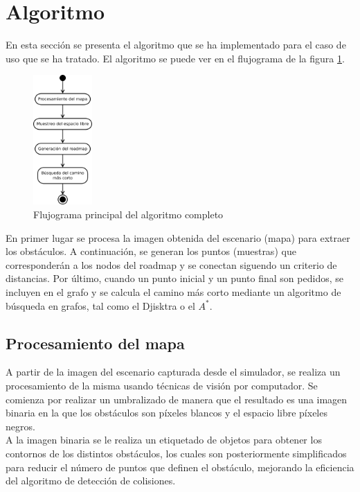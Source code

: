 \section{Algoritmo}
\label{algoritmo}

En esta sección se presenta el algoritmo que se ha implementado para el caso de uso que se ha tratado. El algoritmo se puede ver en el flujograma de la figura \ref{fig:flujo_algoritmo}. \\

\begin{figure}[H]
		\centering
        \includegraphics[width=0.2\textwidth]{images/flujo_main.png}
        \caption{Flujograma principal del algoritmo completo}
        \label{fig:flujo_algoritmo}
\end{figure} 


En primer lugar se procesa la imagen obtenida del escenario (mapa) para extraer los obstáculos. A continuación, se generan los puntos (muestras) que corresponderán a los nodos del roadmap y se conectan siguendo un criterio de distancias. Por último, cuando un punto inicial y un punto final son pedidos, se incluyen en el grafo y se calcula el camino más corto mediante un algoritmo de búsqueda en grafos, tal como el Djisktra o el $A^*$.\\

\subsection{Procesamiento del mapa}

A partir de la imagen del escenario capturada desde el simulador, se realiza un procesamiento de la misma usando técnicas de visión por computador. Se comienza por realizar un umbralizado de manera que el resultado es una imagen binaria en la que los obstáculos son píxeles blancos y el espacio libre píxeles negros. \\

A la imagen binaria se le realiza un etiquetado de objetos para obtener los contornos de los distintos obstáculos, los cuales son posteriormente simplificados para reducir el número de puntos que definen el obstáculo, mejorando la eficiencia del algoritmo de detección de colisiones.\\

